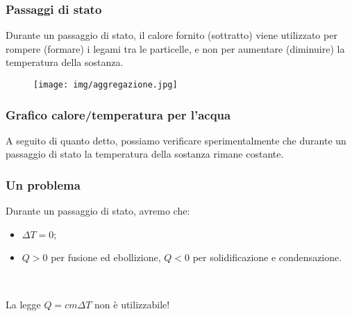 \documentclass[]{beamer}
\theoremstyle{plain}
\begin{document}
\begin{frame}
\frametitle{Passaggi di stato}
Durante un passaggio di stato, il calore fornito (sottratto) viene utilizzato per rompere (formare) i legami tra le particelle, e non per aumentare (diminuire) la temperatura della sostanza.
\begin{figure}
\texttt{[image: img/aggregazione.jpg]}
\end{figure}
\end{frame}



\begin{frame}
\frametitle{Grafico calore/temperatura per l'acqua}
A seguito di quanto detto, possiamo verificare sperimentalmente che \alert{durante un passaggio di stato la temperatura della sostanza rimane costante}.\pause

\begin{figure}
\end{figure}
\end{frame}


\begin{frame}
\frametitle{Un problema}
Durante un passaggio di stato, avremo che:
\begin{itemize}
  \item $ \Delta T = 0 $;\pause
  \item $ Q > 0 $ per fusione ed ebollizione, $ Q<0 $ per solidificazione e condensazione.\pause
\end{itemize}

~

La legge $ Q = cm\Delta T $ non è utilizzabile!
\end{frame}
\end{document}
